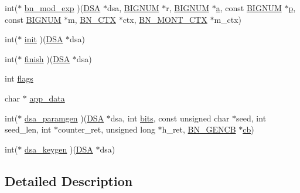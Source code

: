 \begin{DoxyCompactItemize}
\item 
int($\ast$ \hyperlink{structdsa__method_aa81dbd46b4a026034269067431c7452c}{bn\+\_\+mod\+\_\+exp} )(\hyperlink{crypto_2ossl__typ_8h_aa26536f205a5c5f39111260bf246ed9d}{D\+SA} $\ast$dsa, \hyperlink{crypto_2ossl__typ_8h_a6fb19728907ec6515e4bfb716bffa141}{B\+I\+G\+N\+UM} $\ast$r, \hyperlink{crypto_2ossl__typ_8h_a6fb19728907ec6515e4bfb716bffa141}{B\+I\+G\+N\+UM} $\ast$\hyperlink{hpux_8cc_af3e37283d97a42ffc096d8958a745f32}{a}, const \hyperlink{crypto_2ossl__typ_8h_a6fb19728907ec6515e4bfb716bffa141}{B\+I\+G\+N\+UM} $\ast$\hyperlink{ssl__locl_8h_a4014c6f4a6fa0e565ca592bcaca0fa58}{p}, const \hyperlink{crypto_2ossl__typ_8h_a6fb19728907ec6515e4bfb716bffa141}{B\+I\+G\+N\+UM} $\ast$m, \hyperlink{crypto_2ossl__typ_8h_a0b235a35b7dd7922c097571ecd90e2bc}{B\+N\+\_\+\+C\+TX} $\ast$ctx, \hyperlink{crypto_2ossl__typ_8h_aec902d353e00ced6d3fee6cd033a8bd0}{B\+N\+\_\+\+M\+O\+N\+T\+\_\+\+C\+TX} $\ast$m\+\_\+ctx)
\item 
int($\ast$ \hyperlink{structdsa__method_a9be54b09f782278134aac76b2bcd048a}{init} )(\hyperlink{crypto_2ossl__typ_8h_aa26536f205a5c5f39111260bf246ed9d}{D\+SA} $\ast$dsa)
\item 
int($\ast$ \hyperlink{structdsa__method_a586412a5baf76cc021b255a7a412a6bd}{finish} )(\hyperlink{crypto_2ossl__typ_8h_aa26536f205a5c5f39111260bf246ed9d}{D\+SA} $\ast$dsa)
\item 
int \hyperlink{structdsa__method_ac8bf36fe0577cba66bccda3a6f7e80a4}{flags}
\item 
char $\ast$ \hyperlink{structdsa__method_ae2a89f832bf7b6b967e9c3d590e65f83}{app\+\_\+data}
\item 
int($\ast$ \hyperlink{structdsa__method_a4ae2c5961227983dd669becda8800b86}{dsa\+\_\+paramgen} )(\hyperlink{crypto_2ossl__typ_8h_aa26536f205a5c5f39111260bf246ed9d}{D\+SA} $\ast$dsa, int \hyperlink{include_2openssl_2x509v3_8h_ab3c186980893d6836a68407d221ae9c9}{bits}, const unsigned char $\ast$seed, int seed\+\_\+len, int $\ast$counter\+\_\+ret, unsigned long $\ast$h\+\_\+ret, \hyperlink{crypto_2ossl__typ_8h_ae122a8be18f4fe821e5389381ececa09}{B\+N\+\_\+\+G\+E\+N\+CB} $\ast$\hyperlink{include_2openssl_2pem_8h_a921d6e42da41258bdbb0d8184d7554a2}{cb})
\item 
int($\ast$ \hyperlink{structdsa__method_afe4da32d90e0a058c565f1b6465f57d7}{dsa\+\_\+keygen} )(\hyperlink{crypto_2ossl__typ_8h_aa26536f205a5c5f39111260bf246ed9d}{D\+SA} $\ast$dsa)
\end{DoxyCompactItemize}


\subsection{Detailed Description}


